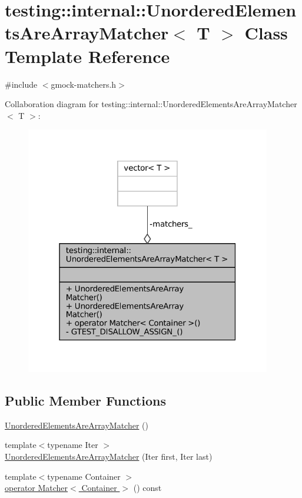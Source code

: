 \hypertarget{classtesting_1_1internal_1_1UnorderedElementsAreArrayMatcher}{}\section{testing\+:\+:internal\+:\+:Unordered\+Elements\+Are\+Array\+Matcher$<$ T $>$ Class Template Reference}
\label{classtesting_1_1internal_1_1UnorderedElementsAreArrayMatcher}


{\ttfamily \#include $<$gmock-\/matchers.\+h$>$}



Collaboration diagram for testing\+:\+:internal\+:\+:Unordered\+Elements\+Are\+Array\+Matcher$<$ T $>$\+:
\nopagebreak
\begin{figure}[H]
\begin{center}
\leavevmode
\includegraphics[width=304pt]{classtesting_1_1internal_1_1UnorderedElementsAreArrayMatcher__coll__graph}
\end{center}
\end{figure}
\subsection*{Public Member Functions}
\begin{DoxyCompactItemize}
\item 
\hyperlink{classtesting_1_1internal_1_1UnorderedElementsAreArrayMatcher_a2a732fdc8ba5918a5337b11df3c556f3}{Unordered\+Elements\+Are\+Array\+Matcher} ()
\item 
{\footnotesize template$<$typename Iter $>$ }\\\hyperlink{classtesting_1_1internal_1_1UnorderedElementsAreArrayMatcher_a5a91694cf5088cb0b7f4b1bb57dee957}{Unordered\+Elements\+Are\+Array\+Matcher} (Iter first, Iter last)
\item 
{\footnotesize template$<$typename Container $>$ }\\\hyperlink{classtesting_1_1internal_1_1UnorderedElementsAreArrayMatcher_ab09b91c39147c51f9c970fd155f2da77}{operator Matcher$<$ Container $>$} () const
\end{DoxyCompactItemize}
